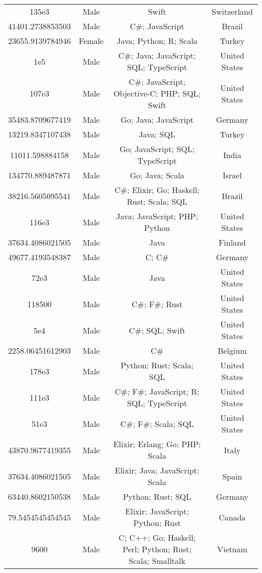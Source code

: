 \begin{center}
\begin{tabular}{ |c|c|c|c| }
135e3  &  Male  &  Swift  &  Switzerland  \\ 
41401.2738853503  &  Male  &  C\#; JavaScript  &  Brazil  \\ 
23655.9139784946  &  Female  &  Java; Python; R; Scala  &  Turkey  \\ 
1e5  &  Male  &  C\#; Java; JavaScript; SQL; TypeScript  &  United States  \\ 
107e3  &  Male  &  C\#; JavaScript; Objective-C; PHP; SQL; Swift  &  United States  \\ 
35483.8709677419  &  Male  &  Go; Java; JavaScript  &  Germany  \\ 
13219.8347107438  &  Male  &  Java; SQL  &  Turkey  \\ 
11011.598884158  &  Male  &  Go; JavaScript; SQL; TypeScript  &  India  \\ 
134770.889487871  &  Male  &  Go; Java; Scala  &  Israel  \\ 
38216.5605095541  &  Male  &  C\#; Elixir; Go; Haskell; Rust; Scala; SQL  &  Brazil  \\ 
116e3  &  Male  &  Java; JavaScript; PHP; Python  &  United States  \\ 
37634.4086021505  &  Male  &  Java  &  Finland  \\ 
49677.4193548387  &  Male  &  C; C\#  &  Germany  \\ 
72e3  &  Male  &  Java  &  United States  \\ 
118500  &  Male  &  C\#; F\#; Rust  &  United States  \\ 
5e4  &  Male  &  C\#; SQL; Swift  &  United States  \\ 
2258.06451612903  &  Male  &  C\#  &  Belgium  \\ 
178e3  &  Male  &  Python; Rust; Scala; SQL  &  United States  \\ 
111e3  &  Male  &  C\#; F\#; JavaScript; R; SQL; TypeScript  &  United States  \\ 
51e3  &  Male  &  C\#; F\#; Scala; SQL  &  United States  \\ 
43870.9677419355  &  Male  &  Elixir; Erlang; Go; PHP; Scala  &  Italy  \\ 
37634.4086021505  &  Male  &  Elixir; Java; JavaScript; Scala  &  Spain  \\ 
63440.8602150538  &  Male  &  Python; Rust; SQL  &  Germany  \\ 
79.5454545454545  &  Male  &  Elixir; JavaScript; Python; Rust  &  Canada  \\ 
9600  &  Male  &  C; C++; Go; Haskell; Perl; Python; Rust; Scala; Smalltalk  &  Vietnam  \\ 

\end{tabular}
\end{center}
